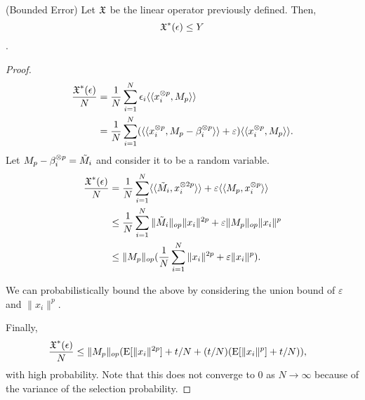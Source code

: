 \begin{lemma}(Bounded Error)
  Let $\operatorname{\mathfrak{X}}$ be the linear operator previously defined. Then,
  $$\operatorname{\mathfrak{X}}^*(\epsilon) \le Y$$.
\end{lemma}
\begin{proof}
  \begin{align*}
    \frac{\operatorname{\mathfrak{X}}^*(\epsilon)}{N} 
    &= \frac{1}{N}\sum_{i=1}^{N} \epsilon_i \langle\langle x_i^{\otimes p}, M_p \rangle\rangle \\
    &= \frac{1}{N}\sum_{i=1}^{N} (\langle\langle x_i^{\otimes p}, M_p - \beta_i^{\otimes p} \rangle\rangle + \varepsilon)  \langle\langle x_i^{\otimes p}, M_p \rangle\rangle.
  \end{align*}
  Let $M_p - \beta_i^{\otimes p} = \tilde M_i$ and consider it to be a random
  variable.
  \begin{align*}
    \frac{\operatorname{\mathfrak{X}}^*(\epsilon)}{N} 
    &= \frac{1}{N}\sum_{i=1}^{N} \langle\langle \tilde M_i, x_i^{\otimes 2p} \rangle\rangle + \varepsilon \langle\langle M_p, x_i^{\otimes p} \rangle\rangle \\
    &\le \frac{1}{N}\sum_{i=1}^{N} \|\tilde M_i\|_{op} \|x_i\|^{2p} + \varepsilon \|M_p\|_{op}\|x_i\|^{p} \\
    &\le \|M_p\|_{op} ( \frac{1}{N}\sum_{i=1}^{N} \|x_i\|^{2p} + \varepsilon \|x_i\|^{p} ).
  \end{align*}

  We can probabilistically bound the above by considering the union
  bound of $\varepsilon$ and $\|x_i\|^p$.


  Finally,
  \begin{align*}
    \frac{\operatorname{\mathfrak{X}}^*(\epsilon)}{N} 
    &\le \|M_p\|_{op} (\operatorname{E}[\|x_i\|^{2p}] + t/N + (t/N) (\operatorname{E}[ \|x_i\|^{p} ] + t/N) ),
  \end{align*}
  with high probability. Note that this does not converge to $0$ as $N
  \to \infty$ because of the variance of the selection probability.
\end{proof}
